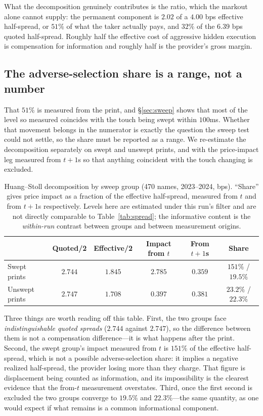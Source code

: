 \documentclass[11pt]{article}
\begin{document}
What the decomposition genuinely contributes is the ratio, which the markout alone cannot
supply: the permanent component is $2.02$ of a $4.00$ bps effective half-spread, or $51\%$
of what the taker actually pays, and $32\%$ of the $6.39$ bps quoted half-spread. Roughly
half the effective cost of aggressive hidden execution is compensation for information and
roughly half is the provider's gross margin.

\subsection{The adverse-selection share is a range, not a number}
\label{sec:hsrange}

That $51\%$ is measured from the print, and \S\ref{sec:sweep} shows that most of the level so
measured coincides with the touch being swept within $100$ms. Whether that movement belongs
in the numerator is exactly the question the sweep test could not settle, so the share must
be reported as a range. We re-estimate the decomposition separately on swept and unswept
prints, and with the price-impact leg measured from $t+1$s so that anything coincident with
the touch changing is excluded.

\begin{table}[htbp]
\centering
\begin{tabular}{lccccc}
\toprule
& \textbf{Quoted/2} & \textbf{Effective/2} & \textbf{Impact from $t$} & \textbf{From $t+1$s} & \textbf{Share} \\
\midrule
Swept prints & $2.744$ & $1.845$ & $2.785$ & $0.359$ & $151\%$ / $19.5\%$ \\
Unswept prints & $2.747$ & $1.708$ & $0.397$ & $0.381$ & $23.2\%$ / $22.3\%$ \\
\bottomrule
\end{tabular}
\caption{Huang--Stoll decomposition by sweep group (470 names, 2023--2024, bps). ``Share''
gives price impact as a fraction of the effective half-spread, measured from $t$ and from
$t+1$s respectively. Levels here are estimated under this run's filter and are not directly
comparable to Table~\ref{tab:spread}; the informative content is the \emph{within-run}
contrast between groups and between measurement origins.}
\label{tab:hsrange}
\end{table}

Three things are worth reading off this table. First, the two groups face
\emph{indistinguishable quoted spreads} ($2.744$ against $2.747$), so the difference between
them is not a compensation difference---it is what happens after the print. Second, the swept
group's impact measured from $t$ is $151\%$ of the effective half-spread, which is not a
possible adverse-selection share: it implies a negative realized half-spread, the provider
losing more than they charge. That figure is displacement being counted as information, and
its impossibility is the clearest evidence that the from-$t$ measurement overstates. Third,
once the first second is excluded the two groups converge to $19.5\%$ and $22.3\%$---the same
quantity, as one would expect if what remains is a common informational component.
\end{document}
